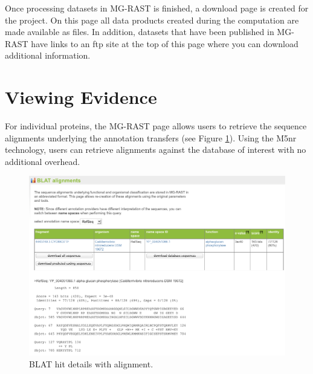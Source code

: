 \documentclass[12pt,fullpage]{report}
\begin{document}
Once processing datasets in MG-RAST is finished, a download page is created for the project. On this page all data products created during the computation are made available as files. In addition, datasets that have been published in MG-RAST have links to an ftp site at the top of this page where you can download additional information.

\section{Viewing Evidence}

For individual proteins, the MG-RAST page allows users to retrieve the sequence alignments underlying the annotation transfers (see Figure \ref{fig:blat-alignment}).
Using the M5nr \cite{M5NR} technology, users can retrieve alignments against the database of interest with no additional overhead.

\begin{figure}[ht]
\begin{center}
\includegraphics[width=6in]{Images/blat-alignment.png}
\end{center}
\caption{
BLAT hit details with alignment.
}
\label{fig:blat-alignment}
\end{figure}
\end{document}
